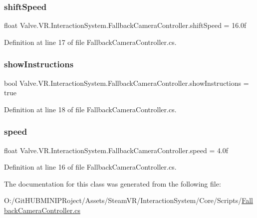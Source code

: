 \subsubsection{\texorpdfstring{shiftSpeed}{shiftSpeed}}
{\footnotesize\ttfamily float Valve.\+V\+R.\+Interaction\+System.\+Fallback\+Camera\+Controller.\+shift\+Speed = 16.\+0f}



Definition at line 17 of file Fallback\+Camera\+Controller.\+cs.

\mbox{\label{class_valve_1_1_v_r_1_1_interaction_system_1_1_fallback_camera_controller_abb454e7996557d76358c38d1de1eeb49}} 
\subsubsection{\texorpdfstring{showInstructions}{showInstructions}}
{\footnotesize\ttfamily bool Valve.\+V\+R.\+Interaction\+System.\+Fallback\+Camera\+Controller.\+show\+Instructions = true}



Definition at line 18 of file Fallback\+Camera\+Controller.\+cs.

\mbox{\label{class_valve_1_1_v_r_1_1_interaction_system_1_1_fallback_camera_controller_a8b9e610801baae4ed6e64583a48c8152}} 
\subsubsection{\texorpdfstring{speed}{speed}}
{\footnotesize\ttfamily float Valve.\+V\+R.\+Interaction\+System.\+Fallback\+Camera\+Controller.\+speed = 4.\+0f}



Definition at line 16 of file Fallback\+Camera\+Controller.\+cs.



The documentation for this class was generated from the following file\+:\begin{DoxyCompactItemize}
\item 
O\+:/\+Git\+H\+U\+B\+M\+I\+N\+I\+P\+Roject/\+Assets/\+Steam\+V\+R/\+Interaction\+System/\+Core/\+Scripts/\mbox{\hyperlink{_fallback_camera_controller_8cs}{Fallback\+Camera\+Controller.\+cs}}\end{DoxyCompactItemize}
